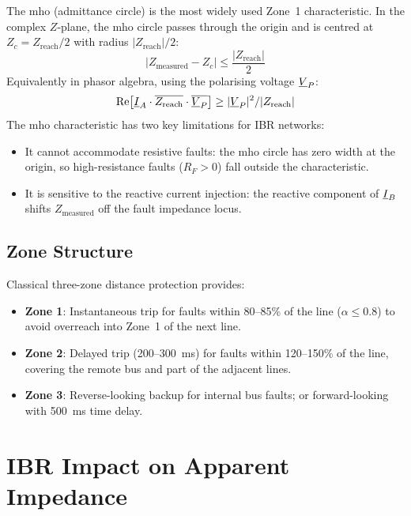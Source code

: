 The mho (admittance circle) is the most widely used Zone~1 characteristic.
In the complex $Z$-plane, the mho circle passes through the origin and
is centred at $Z_c = Z_\mathrm{reach}/2$ with radius $|Z_\mathrm{reach}|/2$:
\begin{equation}
  |Z_\mathrm{measured} - Z_c| \leq \frac{|Z_\mathrm{reach}|}{2}
  \label{eq:ch5_mho}
\end{equation}
Equivalently in phasor algebra, using the polarising voltage $\underline{V}_P$:
\begin{equation}
  \mathrm{Re}\!\left[\underline{I}_A \cdot \overline{Z_\mathrm{reach}} \cdot
    \overline{\underline{V}_P}\right] \geq |\underline{V}_P|^2 / |Z_\mathrm{reach}|
  \label{eq:ch5_mho_phasor}
\end{equation}
The mho characteristic has two key limitations for IBR networks:
\begin{itemize}
\item It cannot accommodate resistive faults: the mho circle has zero
      width at the origin, so high-resistance faults ($R_F > 0$) fall
      outside the characteristic.
\item It is sensitive to the reactive current injection: the reactive
      component of $\underline{I}_B$ shifts $Z_\mathrm{measured}$ off the
      fault impedance locus.
\end{itemize}

\subsection{Zone Structure}

Classical three-zone distance protection provides:
\begin{itemize}
\item \textbf{Zone 1}: Instantaneous trip for faults within 80--85\% of
      the line ($\alpha \leq 0.8$) to avoid overreach into Zone~1 of
      the next line.
\item \textbf{Zone 2}: Delayed trip (200--300~ms) for faults within
      120--150\% of the line, covering the remote bus and part of
      the adjacent lines.
\item \textbf{Zone 3}: Reverse-looking backup for internal bus faults;
      or forward-looking with 500~ms time delay.
\end{itemize}

\section{IBR Impact on Apparent Impedance}
\label{sec:ch7_ibr_impact}

